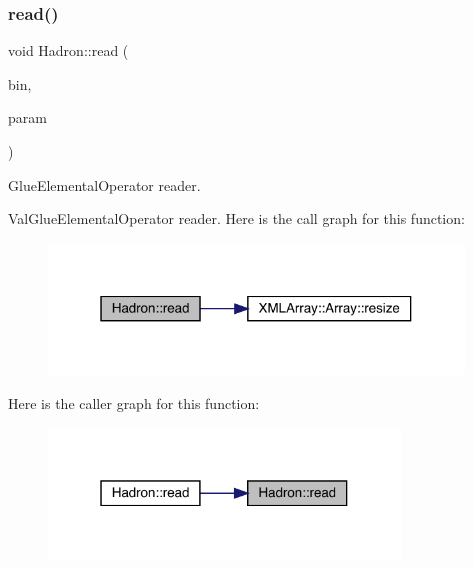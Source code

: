 \subsubsection{\texorpdfstring{read()}{read()}\hspace{0.1cm}{\footnotesize\ttfamily [65/94]}}
{\footnotesize\ttfamily void Hadron\+::read (\begin{DoxyParamCaption}\item[{\mbox{\hyperlink{classADATIO_1_1BinaryReader}{Binary\+Reader}} \&}]{bin,  }\item[{\mbox{\hyperlink{structHadron_1_1ValGlueElementalOperator__t}{Val\+Glue\+Elemental\+Operator\+\_\+t}} \&}]{param }\end{DoxyParamCaption})}



Glue\+Elemental\+Operator reader. 

Val\+Glue\+Elemental\+Operator reader. Here is the call graph for this function\+:
\nopagebreak
\begin{figure}[H]
\begin{center}
\leavevmode
\includegraphics[width=313pt]{d1/daf/namespaceHadron_a9991ac06f4136479286a214307cd17dc_cgraph}
\end{center}
\end{figure}
Here is the caller graph for this function\+:
\nopagebreak
\begin{figure}[H]
\begin{center}
\leavevmode
\includegraphics[width=265pt]{d1/daf/namespaceHadron_a9991ac06f4136479286a214307cd17dc_icgraph}
\end{center}
\end{figure}
\mbox{\label{namespaceHadron_a6860ee691eb6d64d0fb2d52f4977316b}} 
